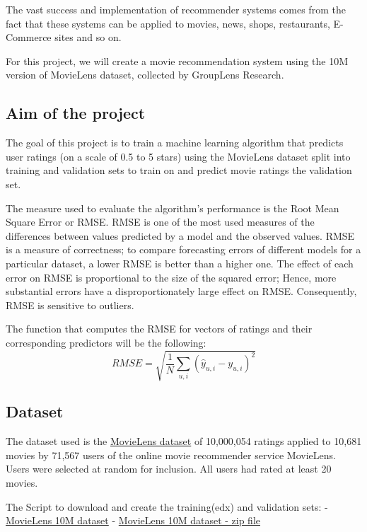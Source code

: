 \documentclass[
]{article}
\begin{document}
The vast success and implementation of recommender systems comes from
the fact that these systems can be applied to movies, news, shops,
restaurants, E-Commerce sites and so on.

For this project, we will create a movie recommendation system using the
10M version of MovieLens dataset, collected by GroupLens Research.

\hypertarget{aim-of-the-project}{%
\subsection{Aim of the project}\label{aim-of-the-project}}

The goal of this project is to train a machine learning algorithm that
predicts user ratings (on a scale of 0.5 to 5 stars) using the MovieLens
dataset split into training and validation sets to train on and predict
movie ratings the validation set.

The measure used to evaluate the algorithm's performance is the Root
Mean Square Error or RMSE. RMSE is one of the most used measures of the
differences between values predicted by a model and the observed values.
RMSE is a measure of correctness; to compare forecasting errors of
different models for a particular dataset, a lower RMSE is better than a
higher one. The effect of each error on RMSE is proportional to the size
of the squared error; Hence, more substantial errors have a
disproportionately large effect on RMSE. Consequently, RMSE is sensitive
to outliers.

The function that computes the RMSE for vectors of ratings and their
corresponding predictors will be the following:
\[ RMSE = \sqrt{\frac{1}{N}\displaystyle\sum_{u,i} (\hat{y}_{u,i}-y_{u,i})^{2}} \]

\pagebreak

\hypertarget{dataset}{%
\subsection{Dataset}\label{dataset}}

The dataset used is the
\href{https://grouplens.org/datasets/movielens/10m/}{MovieLens dataset}
of 10,000,054 ratings applied to 10,681 movies by 71,567 users of the
online movie recommender service MovieLens. Users were selected at
random for inclusion. All users had rated at least 20 movies.

The Script to download and create the training(edx) and validation sets:
- \href{https://grouplens.org/datasets/movielens/10m/}{MovieLens 10M
dataset} -
\href{http://files.grouplens.org/datasets/movielens/ml-10m.zip}{MovieLens
10M dataset - zip file}
\end{document}
